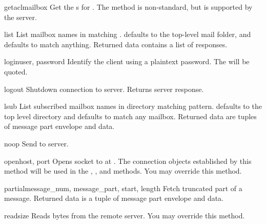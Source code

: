 \begin{methoddesc}{getacl}{mailbox}
  Get the s for .
  The method is non-standard, but is supported by the  server.
\end{methoddesc}

\begin{methoddesc}{list}{}
  List mailbox names in  matching
  .   defaults to the top-level mail
  folder, and  defaults to match anything.  Returned data
  contains a list of  responses.
\end{methoddesc}

\begin{methoddesc}{login}{user, password}
  Identify the client using a plaintext password.
  The  will be quoted.
\end{methoddesc}

\begin{methoddesc}{logout}{}
  Shutdown connection to server. Returns server  response.
\end{methoddesc}

\begin{methoddesc}{lsub}{}
  List subscribed mailbox names in directory matching pattern.
   defaults to the top level directory and
   defaults to match any mailbox.
  Returned data are tuples of message part envelope and data.
\end{methoddesc}

\begin{methoddesc}{noop}{}
  Send  to server.
\end{methoddesc}

\begin{methoddesc}{open}{host, port}
  Opens socket to  at .
  The connection objects established by this method
  will be used in the , , and  methods.
  You may override this method.
\end{methoddesc}

\begin{methoddesc}{partial}{message_num, message_part, start, length}
  Fetch truncated part of a message.
  Returned data is a tuple of message part envelope and data.
\end{methoddesc}

\begin{methoddesc}{read}{size}
  Reads  bytes from the remote server.
  You may override this method.
\end{methoddesc}

